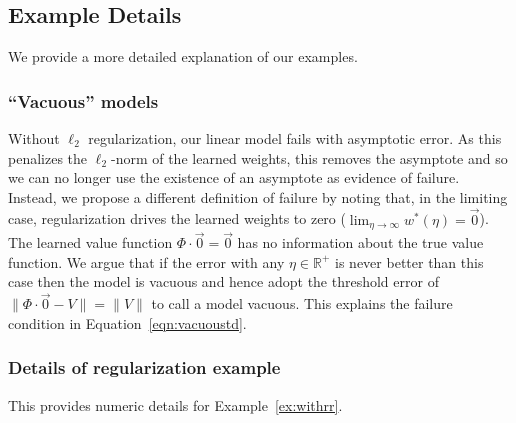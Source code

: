 \subsection{Example Details}

We provide a more detailed explanation of our examples.

\subsubsection{``Vacuous'' models}
\label{sec:choiceoffailure}
Without $\ell_2$ regularization, our linear model fails with asymptotic error. As this penalizes the $\ell_2$-norm of the learned weights, this removes the asymptote and so we can no longer use the existence of an asymptote as evidence of failure. Instead, we propose a different definition of failure by noting that, in the limiting case, regularization drives the learned weights to zero ($\lim_{\eta\to\infty} w^*(\eta) = \vec 0$). The learned value function $\Phi\cdot\vec 0 = \vec 0$ has no information about the true value function. We argue that if the error with any $\eta\in\mathbb R^+$ is never better than this case then the model is vacuous and hence adopt the threshold error of $\|\Phi\cdot\vec 0 - V\| = \|V\|$ to call a model vacuous. This explains the failure condition in Equation~\ref{eqn:vacuoustd}.

\subsubsection{Details of regularization example}
\label{sec:rrdetails}

This provides numeric details for Example~\ref{ex:withrr}.

